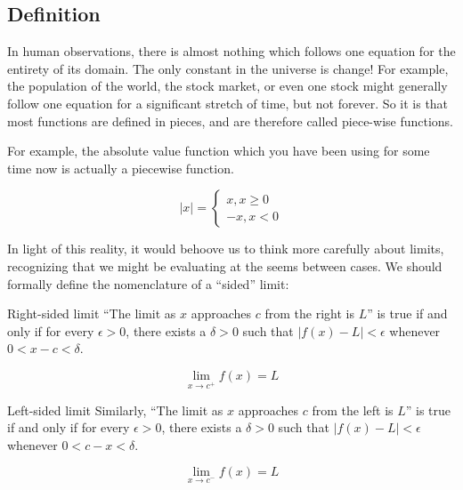 
\subsection{Definition}



In human observations, there is almost nothing which follows one equation for the 
entirety of its domain.  The only constant in the universe is change!  For example, 
the population of the world, the stock market, or even one stock might generally follow one
equation for a significant stretch of time, but not forever.  So it is that most functions are 
defined in pieces, and are therefore called piece-wise functions.

For example, the absolute value function which you have been using for some time now is
actually a piecewise function.

$$
|x|=
\begin{cases}
x, x\ge 0\\
-x,x<0
\end{cases}
$$

In light of this reality, it would behoove us to think more carefully about limits, recognizing that
we might be evaluating at the seems between cases.  
We should formally define the nomenclature of a ``sided'' limit:

\begin{derivation}{Right-sided limit}
``The limit as $x$ approaches $c$ from the right is $L$'' is true if and only if for every $\epsilon > 0$, there exists a $\delta > 0$ such that
$|f(x)-L|<\epsilon$ whenever $0<x-c<\delta$.

$$\lim_{x \to c^+}f(x) = L$$
\end{derivation}


\begin{derivation}{Left-sided limit}
Similarly, ``The limit as $x$ approaches $c$ from the left is $L$'' is true if and only if for every $\epsilon > 0$, there exists a $\delta > 0$ such that
$|f(x)-L|<\epsilon$ whenever $0<c-x<\delta$.

$$\lim_{x \to c^-}f(x) = L$$
\end{derivation}



